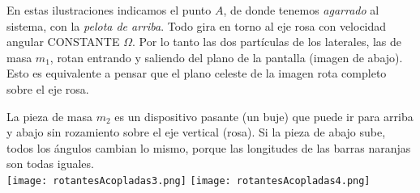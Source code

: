 \documentclass[11pt, spanish, a4paper, twoside]{article}
\begin{document}
\begin{enumerate}
	En estas ilustraciones indicamos el punto \(A\), de donde tenemos \emph{agarrado} al sistema, con la \emph{pelota de arriba}.
	Todo gira en torno al eje rosa con velocidad angular CONSTANTE $\Omega$.
	Por lo tanto las dos partículas de los laterales, las de masa $m_1$, rotan entrando y saliendo del plano de la pantalla (imagen de abajo).
	Esto es equivalente a pensar que el plano celeste de la imagen rota completo sobre el eje rosa.
	
	La pieza de masa $m_2$ es un dispositivo pasante (un buje) que puede ir para arriba y abajo sin rozamiento sobre el eje vertical (rosa).
	Si la pieza de abajo sube, todos los ángulos cambian lo mismo, porque las longitudes de las barras naranjas son todas iguales.\\
	\texttt{[image: rotantesAcopladas3.png]}
	\texttt{[image: rotantesAcopladas4.png]}
	

\end{enumerate}
\end{document}
